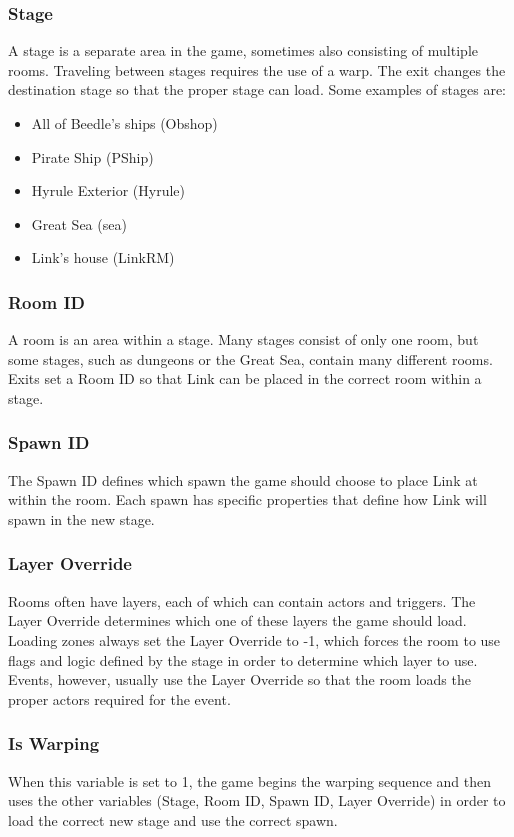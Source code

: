\documentclass[titlepage,12pt,a4paper]{article}
\begin{document}
\subsubsection{Stage}
A stage is a separate area in the game, sometimes also consisting of multiple rooms. Traveling between stages requires the use of a warp. The exit changes the destination stage so that the proper stage can load. Some examples of stages are: 
\begin{itemize}
	\item All of Beedle’s ships (Obshop)
	\item Pirate Ship (PShip)
	\item Hyrule Exterior (Hyrule)
	\item Great Sea (sea)
	\item Link’s house (LinkRM)
\end{itemize}

\subsubsection{Room ID}
A room is an area within a stage. Many stages consist of only one room, but some stages, such as dungeons or the Great Sea, contain many different rooms. Exits set a Room ID so that Link can be placed in the correct room within a stage.

\subsubsection{Spawn ID}
The Spawn ID defines which spawn the game should choose to place Link at within the room. Each spawn has specific properties that define how Link will spawn in the new stage.

\subsubsection{Layer Override}
Rooms often have layers, each of which can contain actors and triggers. The Layer Override determines which one of these layers the game should load. Loading zones always set the Layer Override to -1, which forces the room to use flags and logic defined by the stage in order to determine which layer to use. Events, however, usually use the Layer Override so that the room loads the proper actors required for the event.

\subsubsection{Is Warping}
When this variable is set to 1, the game begins the warping sequence and then uses the other variables (Stage, Room ID, Spawn ID, Layer Override) in order to load the correct new stage and use the correct spawn.
\end{document}
